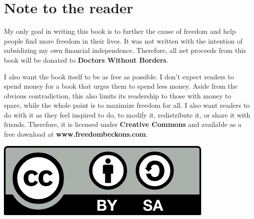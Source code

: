 \chapter{Note to the reader}
\thispagestyle{empty}
My only goal in writing this book is to further the cause of freedom and help people find more freedom in their lives. It was not written with the intention of subsidizing my own financial independence. Therefore, all net proceeds from this book will be donated to \textbf{Doctors Without Borders}.

I also want the book itself to be as free as possible. I don't expect readers to spend money for a book that urges them to spend less money. Aside from the obvious contradiction, this also limits its readership to those with money to spare, while the whole point is to maximize freedom for all. I also want readers to do with it as they feel inspired to do, to modify it, redistribute it, or share it with friends. Therefore, it is licensed under \textbf{Creative Commons} and available as a free download at \textbf{www.freedombeckons.com}.

\includegraphics[bb=-100 40 0 0]{cc.png}
